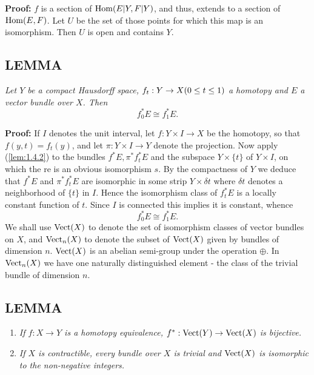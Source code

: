 \textbf{Proof:} $f$ is a section of $\operatorname{Hom}(E \vert Y, F \vert Y)$, and thus, extends to a section of $\operatorname{Hom}(E, F)$. Let $U$ be the set of those points for which this map is an isomorphism. Then $U$ is open and contains $Y$.

\subsection{LEMMA}\label{lem:1.4.3} \textit{Let $Y$ be a compact Hausdorff space, $f_t: Y \to X \\ (0 \leq t \leq 1)$ a homotopy and $E$ a vector bundle over $X$. Then}
\begin{equation}
    f_0^*E \cong f_1^*E.
\end{equation}

\textbf{Proof:} If $I$ denotes the unit interval, let $f: Y \times I \to X$ be the homotopy, so that $f(y, t) = f_t(y)$, and let $\pi: Y \times I \to Y$ denote the projection. Now apply (\ref{lem:1.4.2}) to the bundles $f^*E, \pi^* f_t^* E$ and the subspace $Y \times \{t\}$ of $Y \times I$, on which the re is an obvious isomorphism $s$. By the compactness of $Y$ we deduce that $f^*E$ and $\pi^* f_t^* E$ are isomorphic in some strip $Y \times \delta t$ where $\delta t$ denotes a neighborhood of $\{t\}$ in $I$. Hence the isomorphism class of $f_t^*E$ is a locally constant function of $t$. Since $I$ is connected this implies it is constant, whence
\begin{equation}
f_0^*E \cong f_1^*E.
\end{equation}
We shall use $\operatorname{Vect}(X)$ to denote the set of isomorphism classes of vector bundles on $X$, and $\operatorname{Vect}_n(X)$ to denote the subset of $\operatorname{Vect}(X)$ given by bundles of dimension $n$. $\operatorname{Vect}(X)$ is an abelian semi-group under the operation $\oplus$. In $\operatorname{Vect}_n(X)$ we have one naturally distinguished element - the class of the trivial bundle of dimension $n$.

\subsection{LEMMA}\label{lem:1.4.4}
\begin{enumerate}[(1)]
    \item \textit{If $f: X \to Y$ is a homotopy equivalence, $f^*: \operatorname{Vect}(Y) \to \operatorname{Vect}(X)$ is bijective.}
    \item \textit{If $X$ is contractible, every bundle over $X$ is trivial and $\operatorname{Vect}(X)$ is isomorphic to the non-negative integers.}
\end{enumerate}


